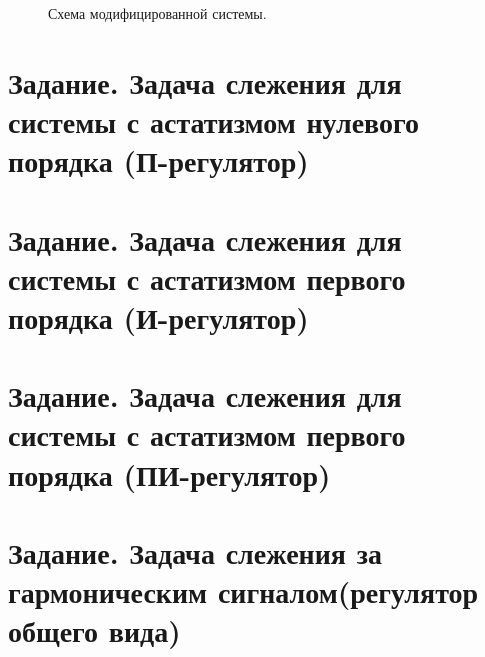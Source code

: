 \documentclass[a5paper, 10pt]{article}
\theoremstyle{definition}
\theoremstyle{plain}
\theoremstyle{remark}
\begin{document}
\begin{figure}[h!]
\caption{Схема модифицированной системы.}
\end{figure}







\newpage
\section{Задание. Задача слежения для системы с астатизмом нулевого порядка (П-регулятор)}
\section{Задание. Задача слежения для системы с астатизмом первого порядка (И-регулятор)}
\section{Задание. Задача слежения для системы с астатизмом первого порядка (ПИ-регулятор)}
\section{Задание. Задача слежения за гармоническим сигналом(регулятор общего вида)}
\end{document}
